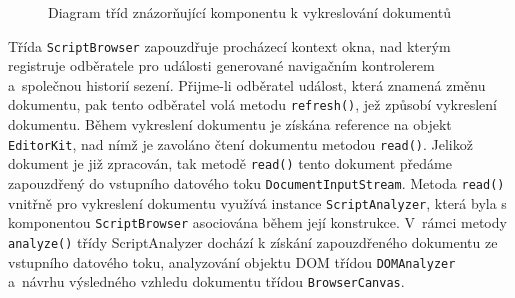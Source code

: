 \begin{figure}[H]
  \begin{center}
    \caption{Diagram tříd znázorňující komponentu k vykreslování dokumentů}
    \label{Figure.ScriptBrowserUserAgent}
  \end{center}
\end{figure}

Třída \texttt{ScriptBrowser} zapouzdřuje procházecí kontext okna, nad kterým registruje odběratele pro události generované navigačním kontrolerem a~společnou historií sezení. Přijme-li odběratel událost, která znamená změnu dokumentu, pak tento odběratel volá metodu \texttt{refresh()}, jež způsobí vykreslení dokumentu. Během vykreslení dokumentu je získána reference na objekt \texttt{EditorKit}, nad nímž je zavoláno čtení dokumentu metodou \texttt{read()}. Jelikož dokument je již zpracován, tak metodě \texttt{read()} tento dokument předáme zapouzdřený do vstupního datového toku \texttt{DocumentInputStream}. Metoda \texttt{read()} vnitřně pro vykreslení dokumentu využívá instance \texttt{ScriptAnalyzer}, která byla s komponentou \texttt{ScriptBrowser} asociována během její konstrukce. V~rámci metody \texttt{analyze()} třídy ScriptAnalyzer dochází k  získání zapouzdřeného dokumentu ze vstupního datového toku, analyzování objektu DOM třídou \texttt{DOMAnalyzer} a~návrhu výsledného vzhledu dokumentu třídou \texttt{BrowserCanvas}.

